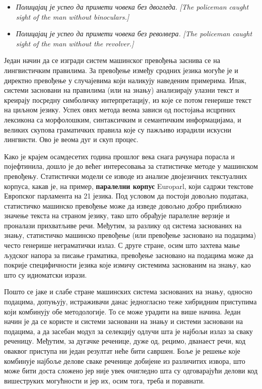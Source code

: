 \begin{multicols}{2}
\begin{itemize} 
\item \textit{Полицајац је успео да примети човека без двогледа}. \textit{[The policeman caught sight of the man without binoculars.]}
\item \textit{Полицајац је успео да примети човека без револвера.} \textit{[The policeman caught sight of  the man without the revolver.]}
\end{itemize}
Један начин да се изгради систем машинског превођења заснива се на лингвистичким правилима. За превођење између сродних језика могуће је и директно превођење у случајевима који наликују наведеним примерима. Ипак, системи засновани на правилима (или на знању) анализирају улазни текст и креирају посредну симболичку интерпретацију, из које се потом генерише текст на циљном језику. Успех ових метода веома зависи од постојања исцрпних лексикона са морфолошким, синтаксичким и семантичким информацијама, и великих скупова граматичких правила које су пажљиво израдили искусни лингвисти. Ово је веома дуг и скуп процес.

Како је крајем осамдесетих година прошлог века снага рачунара порасла и појефтинила, дошло је до већег интересовања за статистичке методе у машинском превођењу. Статистички модели се изводе из анализе двојезичних текстуалних корпуса, какав је, на пример, \textbf{паралелни корпус} Europarl, који садржи текстове Европског парламента на 21 језика. Под условом да постоји довољно података, статистичко машинско превођење може да изведе довољно добро приближно значење текста на страном језику, тако што обрађује паралелне верзије и проналази прихватљиве речи. Међутим, за разлику од система заснованих на знању, статистичко машинско превођење (или превођење засновано на подацима) често генерише неграматички излаз. С друге стране, осим што захтева мање људског напора за писање граматика, превођење засновано на подацима  може да покрије специфичности језика које измичу системима заснованим на знању, као што су идиоматски изрази. 

Пошто се јаке и слабе стране машинских система заснованих на знању, односно подацима, допуњују, истраживачи данас једногласно теже хибридним приступима који комбинују обе методологије. То се може урадити на више начина. Један начин је да се користе и системи засновани на знању и системи засновани на подацима, а да засебан модул за селекцију одлучи шта је најбољи излаз за сваку реченицу. Међутим, за дугачке реченице, дуже од, рецимо, дванаест речи, код оваквог приступа ни један резултат неће бити савршен. Боље је решење које комбинује најбоље делове сваке реченице добијене из различитих извора, што може бити доста сложено јер није увек очигледно шта су одговарајући делови код вишеструких могућности и јер их, осим тога, треба и поравнати. 


\end{multicols}
